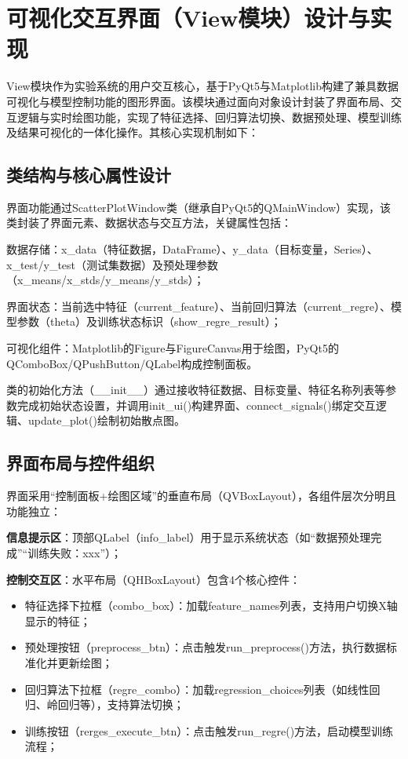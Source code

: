 \section{可视化交互界面（View模块）设计与实现}
View模块作为实验系统的用户交互核心，基于PyQt5与Matplotlib构建了兼具数据可视化与模型控制功能的图形界面。该模块通过面向对象设计封装了界面布局、交互逻辑与实时绘图功能，实现了特征选择、回归算法切换、数据预处理、模型训练及结果可视化的一体化操作。其核心实现机制如下：

\subsection{类结构与核心属性设计}
\par 界面功能通过ScatterPlotWindow类（继承自PyQt5的QMainWindow）实现，该类封装了界面元素、数据状态与交互方法，关键属性包括：
\par 数据存储：x\_data（特征数据，DataFrame）、y\_data（目标变量，Series）、x\_test/y\_test（测试集数据）及预处理参数（x\_means/x\_stds/y\_means/y\_stds）；
\par 界面状态：当前选中特征（current\_feature）、当前回归算法（current\_regre）、模型参数（theta）及训练状态标识（show\_regre\_result）；
\par  可视化组件：Matplotlib的Figure与FigureCanvas用于绘图，PyQt5的QComboBox/QPushButton/QLabel构成控制面板。

类的初始化方法（\_\_init\_\_）通过接收特征数据、目标变量、特征名称列表等参数完成初始状态设置，并调用init\_ui()构建界面、connect\_signals()绑定交互逻辑、update\_plot()绘制初始散点图。

\subsection{界面布局与控件组织}
界面采用“控制面板+绘图区域”的垂直布局（QVBoxLayout），各组件层次分明且功能独立：
\par  \textbf{信息提示区}：顶部QLabel（info\_label）用于显示系统状态（如“数据预处理完成”“训练失败：xxx”）；
\par  \textbf{控制交互区}：水平布局（QHBoxLayout）包含4个核心控件：
\begin{itemize}
  \item 特征选择下拉框（combo\_box）：加载feature\_names列表，支持用户切换X轴显示的特征；
  \item  预处理按钮（preprocess\_btn）：点击触发run\_preprocess()方法，执行数据标准化并更新绘图；
  \item 回归算法下拉框（regre\_combo）：加载regression\_choices列表（如线性回归、岭回归等），支持算法切换；
  \item  训练按钮（rerges\_execute\_btn）：点击触发run\_regre()方法，启动模型训练流程；
\end{itemize}

